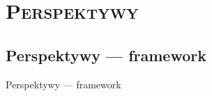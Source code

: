 \section{\scshape Perspektywy}

\subsection{Perspektywy --- framework}
\begin{frame}{Perspektywy --- framework}
\end{frame}